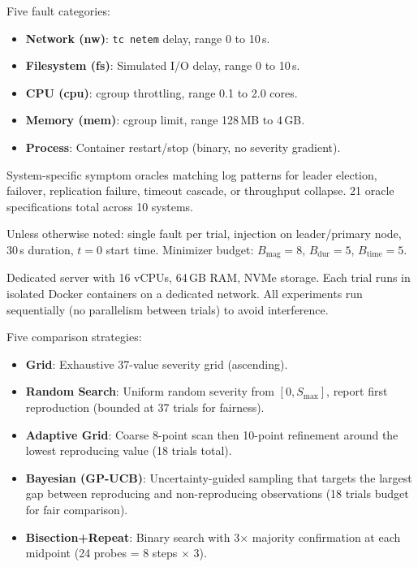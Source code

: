  Five fault categories:
\begin{itemize}[leftmargin=*,topsep=2pt,itemsep=1pt]
  \item \textbf{Network (nw)}: \texttt{tc netem} delay, range 0 to 10\,s.
  \item \textbf{Filesystem (fs)}: Simulated I/O delay, range 0 to 10\,s.
  \item \textbf{CPU (cpu)}: cgroup throttling, range 0.1 to 2.0 cores.
  \item \textbf{Memory (mem)}: cgroup limit, range 128\,MB to 4\,GB.
  \item \textbf{Process}: Container restart/stop (binary, no severity gradient).
\end{itemize}

 System-specific symptom oracles matching log patterns for
leader election, failover, replication failure, timeout cascade, or throughput
collapse. 21 oracle specifications total across 10 systems.

 Unless otherwise noted: single fault per trial, injection
on leader/primary node, 30\,s duration, $t=0$ start time. Minimizer budget:
$B_{\text{mag}}=8$, $B_{\text{dur}}=5$, $B_{\text{time}}=5$.

 Dedicated server with 16 vCPUs, 64\,GB RAM, NVMe storage.
Each trial runs in isolated Docker containers on a dedicated network. All
experiments run sequentially (no parallelism between trials) to avoid
interference.

 Five comparison strategies:
\begin{itemize}[leftmargin=*,topsep=2pt,itemsep=1pt]
  \item \textbf{\xinda{} Grid}: Exhaustive 37-value severity grid (ascending).
  \item \textbf{Random Search}: Uniform random severity from $[0, S_{\max}]$,
        report first reproduction (bounded at 37 trials for fairness).
  \item \textbf{Adaptive Grid}: Coarse 8-point scan then 10-point refinement
        around the lowest reproducing value (18 trials total).
  \item \textbf{Bayesian (GP-UCB)}: Uncertainty-guided sampling that targets the
        largest gap between reproducing and non-reproducing observations (18
        trials budget for fair comparison).
  \item \textbf{Bisection+Repeat}: Binary search with 3$\times$ majority
        confirmation at each midpoint (24 probes = 8 steps $\times$ 3).
\end{itemize}

